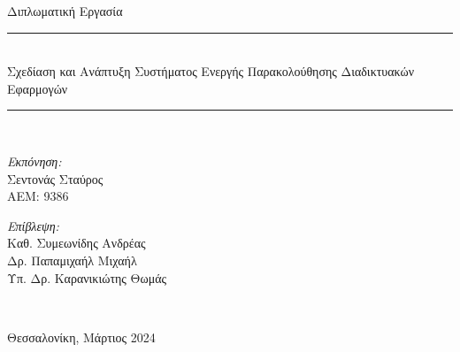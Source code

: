 \begin{titlepage}
  \begin{center}
    \Large Διπλωματική Εργασία \\[0.8cm]

    \rule{450pt}{4pt} \\[0.4cm]
    {\fontsize{20.26pt}{1em}\selectfont Σχεδίαση και Ανάπτυξη Συστήματος Ενεργής Παρακολούθησης Διαδικτυακών Εφαρμογών}

    \rule{350pt}{4pt} \\[4cm]

    \begin{minipage}{0.4\textwidth}
      \begin{flushleft} \normalsize
        \emph{Εκπόνηση:} \\
        Σεντονάς Σταύρος \\
        ΑΕΜ: 9386
      \end{flushleft}
    \end{minipage}
    \begin{minipage}{0.4\textwidth}
      \begin{flushright} \normalsize
        \emph{Επίβλεψη:} \\
        Καθ. Συμεωνίδης Ανδρέας\\
        Δρ. Παπαμιχαήλ Μιχαήλ \\
        Υπ. Δρ. Καρανικιώτης Θωμάς \\
      \end{flushright}
    \end{minipage}
    \\[1cm]
    \vfill

    \large Θεσσαλονίκη, Μάρτιος 2024

  \end{center}
\end{titlepage}
